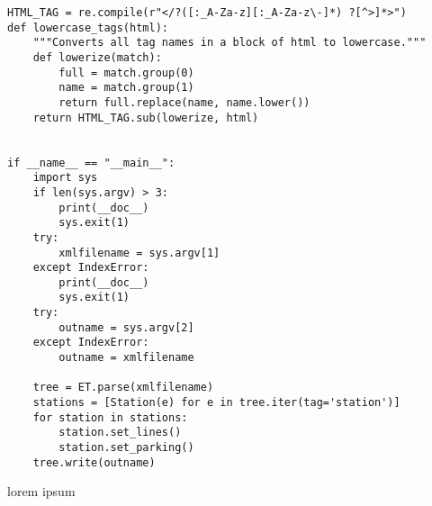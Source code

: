 \documentclass[12pt,titlepage]{article}
\begin{document}
\begin{verbatim}
HTML_TAG = re.compile(r"</?([:_A-Za-z][:_A-Za-z\-]*) ?[^>]*>")
def lowercase_tags(html):
    """Converts all tag names in a block of html to lowercase."""
    def lowerize(match):
        full = match.group(0)
        name = match.group(1)
        return full.replace(name, name.lower())
    return HTML_TAG.sub(lowerize, html)


if __name__ == "__main__":
    import sys
    if len(sys.argv) > 3:
        print(__doc__)
        sys.exit(1)
    try:
        xmlfilename = sys.argv[1]
    except IndexError:
        print(__doc__)
        sys.exit(1)
    try:
        outname = sys.argv[2]
    except IndexError:
        outname = xmlfilename

    tree = ET.parse(xmlfilename)
    stations = [Station(e) for e in tree.iter(tag='station')]
    for station in stations:
        station.set_lines()
        station.set_parking()
    tree.write(outname)

\end{verbatim}

lorem ipsum
\end{document}
